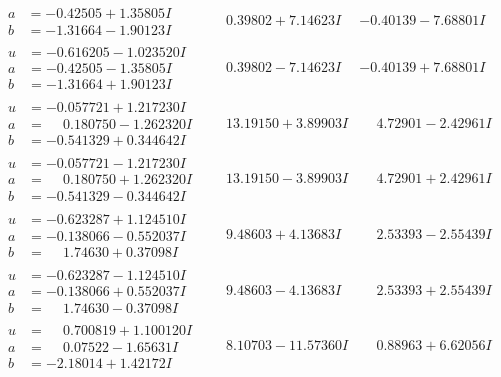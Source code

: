 \documentclass[1p]{elsarticle_modified}
\theoremstyle{definition}
\begin{document}
$$\begin{array}{c|c|c}
\begin{aligned}
a &= -0.42505 + 1.35805 I \\
b &= -1.31664 - 1.90123 I\end{aligned}
 & \phantom{-}0.39802 + 7.14623 I & -0.40139 - 7.68801 I \\ \hline\begin{aligned}
u &= -0.616205 - 1.023520 I \\
a &= -0.42505 - 1.35805 I \\
b &= -1.31664 + 1.90123 I\end{aligned}
 & \phantom{-}0.39802 - 7.14623 I & -0.40139 + 7.68801 I \\ \hline\begin{aligned}
u &= -0.057721 + 1.217230 I \\
a &= \phantom{-}0.180750 - 1.262320 I \\
b &= -0.541329 + 0.344642 I\end{aligned}
 & \phantom{-}13.19150 + 3.89903 I & \phantom{-}4.72901 - 2.42961 I \\ \hline\begin{aligned}
u &= -0.057721 - 1.217230 I \\
a &= \phantom{-}0.180750 + 1.262320 I \\
b &= -0.541329 - 0.344642 I\end{aligned}
 & \phantom{-}13.19150 - 3.89903 I & \phantom{-}4.72901 + 2.42961 I \\ \hline\begin{aligned}
u &= -0.623287 + 1.124510 I \\
a &= -0.138066 - 0.552037 I \\
b &= \phantom{-}1.74630 + 0.37098 I\end{aligned}
 & \phantom{-}9.48603 + 4.13683 I & \phantom{-}2.53393 - 2.55439 I \\ \hline\begin{aligned}
u &= -0.623287 - 1.124510 I \\
a &= -0.138066 + 0.552037 I \\
b &= \phantom{-}1.74630 - 0.37098 I\end{aligned}
 & \phantom{-}9.48603 - 4.13683 I & \phantom{-}2.53393 + 2.55439 I \\ \hline\begin{aligned}
u &= \phantom{-}0.700819 + 1.100120 I \\
a &= \phantom{-}0.07522 - 1.65631 I \\
b &= -2.18014 + 1.42172 I\end{aligned}
 & \phantom{-}8.10703 - 11.57360 I & \phantom{-}0.88963 + 6.62056 I \\ \hline\begin{aligned}

\end{aligned}
\end{array}$$
\end{document}
